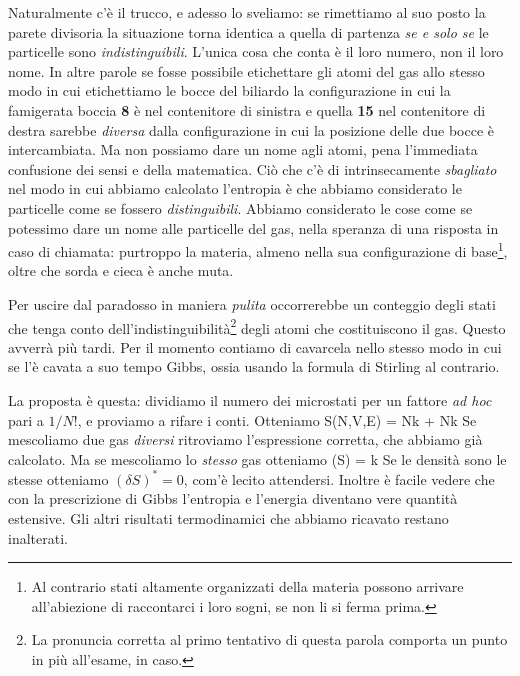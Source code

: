 Naturalmente c'è il trucco, e adesso lo sveliamo: se rimettiamo al suo posto la parete divisoria la situazione torna identica a quella di partenza {\em se e solo se} le particelle sono {\em indistinguibili}. L'unica cosa che conta è il loro numero, non il loro nome. In altre parole se fosse possibile etichettare gli atomi del gas allo stesso modo in cui etichettiamo le bocce del biliardo la configurazione in cui la famigerata boccia \textbf{8} è nel contenitore di sinistra e quella \textbf{15} nel contenitore di destra sarebbe {\em diversa} dalla configurazione in cui la posizione delle due bocce è intercambiata. Ma non possiamo dare un nome agli atomi, pena l'immediata confusione dei sensi e della matematica. Ciò che c'è di intrinsecamente {\em sbagliato} nel modo in cui abbiamo calcolato l'entropia è che abbiamo considerato le particelle come se fossero {\em distinguibili}. Abbiamo considerato le cose come se potessimo dare un nome alle particelle del gas, nella speranza di una risposta in caso di chiamata: purtroppo la materia, almeno nella sua configurazione di base\footnote{Al contrario stati altamente organizzati della materia possono arrivare all'abiezione di raccontarci i loro sogni, se non li si ferma prima.}, oltre che sorda e cieca è anche muta.

Per uscire dal paradosso in maniera {\em pulita} occorrerebbe un conteggio degli stati che tenga conto dell'indistinguibilità\footnote{La pronuncia corretta al primo tentativo di questa parola comporta un punto in più all'esame, in caso.} degli atomi che costituiscono il gas. Questo avverrà più tardi. Per il momento contiamo di cavarcela nello stesso modo in cui se l'è cavata a suo tempo Gibbs, ossia usando la formula di Stirling al contrario.

La proposta è questa: dividiamo il numero dei microstati per un fattore {\em ad hoc} pari a $1/N!$, e proviamo a rifare i conti. Otteniamo
\be
S(N,V,E) = Nk\ln{} + Nk
\ee
Se mescoliamo due gas {\em diversi} ritroviamo l'espressione corretta, che abbiamo già calcolato. Ma se mescoliamo lo {\em stesso} gas otteniamo
\be
(\delta S) = k
\ee
Se le densità sono le stesse otteniamo $(\delta S)^{*} = 0$, com'è lecito attendersi. Inoltre è facile vedere che con la prescrizione di Gibbs l'entropia e l'energia diventano vere quantità estensive. Gli altri risultati termodinamici che abbiamo ricavato restano inalterati.

